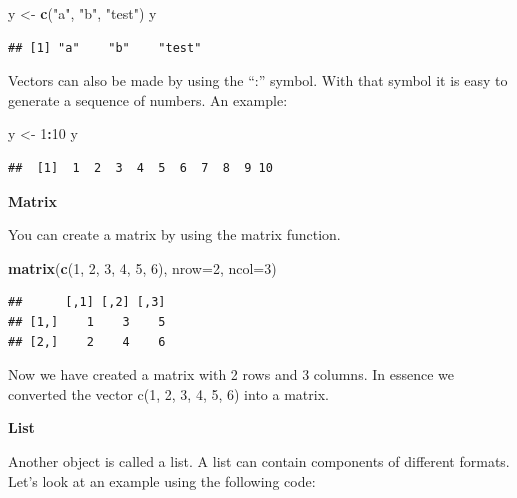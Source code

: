 \documentclass[
]{book}
\newenvironment{Shaded}{\begin{snugshade}}{\end{snugshade}}
\newcommand{\DataTypeTok}[1]{\textcolor[rgb]{0.13,0.29,0.53}{#1}}
\newcommand{\DecValTok}[1]{\textcolor[rgb]{0.00,0.00,0.81}{#1}}
\newcommand{\KeywordTok}[1]{\textcolor[rgb]{0.13,0.29,0.53}{\textbf{#1}}}
\newcommand{\NormalTok}[1]{#1}
\newcommand{\OperatorTok}[1]{\textcolor[rgb]{0.81,0.36,0.00}{\textbf{#1}}}
\newcommand{\StringTok}[1]{\textcolor[rgb]{0.31,0.60,0.02}{#1}}
\begin{document}
\begin{Shaded}
\begin{Highlighting}[]
\NormalTok{y <-}\StringTok{ }\KeywordTok{c}\NormalTok{(}\StringTok{"a"}\NormalTok{, }\StringTok{"b"}\NormalTok{, }\StringTok{"test"}\NormalTok{)}
\NormalTok{y}
\end{Highlighting}
\end{Shaded}

\begin{verbatim}
## [1] "a"    "b"    "test"
\end{verbatim}

Vectors can also be made by using the ``:'' symbol. With that symbol it
is easy to generate a sequence of numbers. An example:

\begin{Shaded}
\begin{Highlighting}[]
\NormalTok{y <-}\StringTok{ }\DecValTok{1}\OperatorTok{:}\DecValTok{10}
\NormalTok{y}
\end{Highlighting}
\end{Shaded}

\begin{verbatim}
##  [1]  1  2  3  4  5  6  7  8  9 10
\end{verbatim}

\textbf{Matrix}

You can create a matrix by using the matrix function.

\begin{Shaded}
\begin{Highlighting}[]
\KeywordTok{matrix}\NormalTok{(}\KeywordTok{c}\NormalTok{(}\DecValTok{1}\NormalTok{, }\DecValTok{2}\NormalTok{, }\DecValTok{3}\NormalTok{, }\DecValTok{4}\NormalTok{, }\DecValTok{5}\NormalTok{, }\DecValTok{6}\NormalTok{), }\DataTypeTok{nrow=}\DecValTok{2}\NormalTok{, }\DataTypeTok{ncol=}\DecValTok{3}\NormalTok{)}
\end{Highlighting}
\end{Shaded}

\begin{verbatim}
##      [,1] [,2] [,3]
## [1,]    1    3    5
## [2,]    2    4    6
\end{verbatim}

Now we have created a matrix with 2 rows and 3 columns. In essence we
converted the vector c(1, 2, 3, 4, 5, 6) into a matrix.

\textbf{List}

Another object is called a list. A list can contain components of
different formats. Let's look at an example using the following code:
\end{document}

